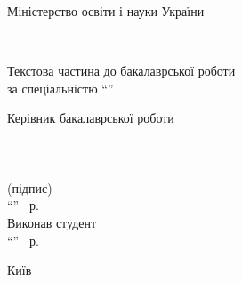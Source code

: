 \begin{titlepage}
    \begin{center}
        {\large Міністерство освіти і науки України\par}\vspace{0.5em}
        {\large \university\\ \department\par}\vspace{2em}

        {\Large \textbf{\thesistitle}\par}\vspace{2em}

        {\large Текстова частина до бакалаврської роботи\\[0.5em]
        за спеціальністю ``\speciality''\par}\vspace{2em}

        \begin{flushright}
        Керівник бакалаврської роботи\\
        \supervisorposition\\
        \supervisorshort\\[2em]

        \underline{\hspace{4cm}}\\
        (підпис)\\[1em]

        ``\underline{\hspace{1cm}}'' \underline{\hspace{3cm}} \thesisyear~р.\\[3em]

        Виконав студент \studentshort\\[1em]
        ``\underline{\hspace{1cm}}'' \underline{\hspace{3cm}} \thesisyear~р.\\
        \end{flushright}

        \vfill
        Київ \thesisyear
    \end{center}
    \newpage
\end{titlepage}
